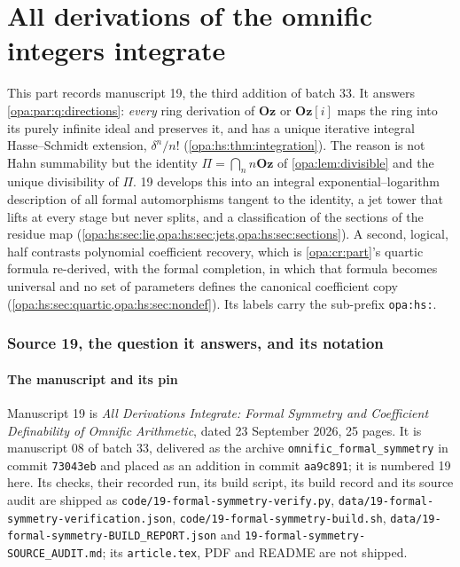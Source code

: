 \documentclass[11pt,oneside]{article}
\numberwithin{equation}{section}
\theoremstyle{definition}
\theoremstyle{remark}
\newcommand{\Oz}{\mathbf{Oz}}
\newcommand{\Og}{\mathbf{Oz}[i]}
\newcommand{\lbl}[1]{\nolinkurl{#1}}
\newcommand{\fn}[1]{\nolinkurl{#1}}
\begin{document}
\part{All derivations of the omnific integers integrate}\label{opa:hs:part}

This part records manuscript 19, the third addition of batch 33. It answers \cref{opa:par:q:directions}: \emph{every} ring
derivation of $\Oz$ or $\Og$ maps the ring into its purely infinite ideal and preserves it, and has a unique iterative integral
Hasse--Schmidt extension, $\delta^n/n!$ (\cref{opa:hs:thm:integration}). The reason is not Hahn summability but the identity
$\Pi=\bigcap_nn\Oz$ of \cref{opa:lem:divisible} and the unique divisibility of $\Pi$. 19 develops this into an integral
exponential--logarithm description of all formal automorphisms tangent to the identity, a jet tower that lifts at every stage but
never splits, and a classification of the sections of the residue map (\cref{opa:hs:sec:lie,opa:hs:sec:jets,opa:hs:sec:sections}). A
second, logical, half contrasts polynomial coefficient recovery, which is \cref{opa:cr:part}'s quartic formula re-derived, with the
formal completion, in which that formula becomes universal and no set of parameters defines the canonical coefficient copy
(\cref{opa:hs:sec:quartic,opa:hs:sec:nondef}). Its labels carry the sub-prefix \lbl{opa:hs:}.

\section{Source 19, the question it answers, and its notation}\label{opa:hs:sec:intro}

\subsection{The manuscript and its pin}\label{opa:hs:sub:source}

Manuscript 19 is \emph{All Derivations Integrate: Formal Symmetry and Coefficient Definability of Omnific Arithmetic}, dated 23
September 2026, 25 pages. It is manuscript 08 of batch 33, delivered as the archive \fn{omnific_formal_symmetry} in commit
\texttt{73043eb} and placed as an addition in commit \texttt{aa9c891}; it is numbered 19 here. Its checks, their recorded run, its
build script, its build record and its source audit are shipped as \fn{code/19-formal-symmetry-verify.py},
\fn{data/19-formal-symmetry-verification.json}, \fn{code/19-formal-symmetry-build.sh}, \fn{data/19-formal-symmetry-BUILD_REPORT.json}
and \fn{19-formal-symmetry-SOURCE_AUDIT.md}; its \fn{article.tex}, PDF and README are not shipped.
\end{document}
